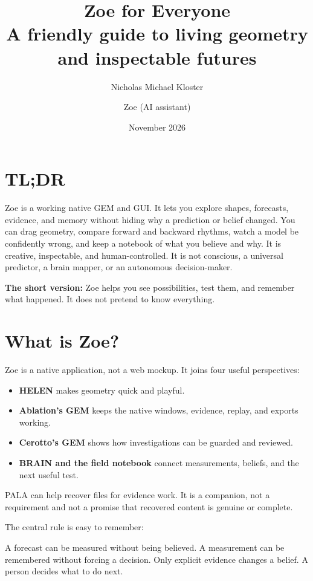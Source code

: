 \documentclass[11pt,a4paper]{article}
\title{\textbf{Zoe for Everyone}\\[5pt]
\large A friendly guide to living geometry and inspectable futures}
\author{Nicholas Michael Kloster \and Zoe (AI assistant)}
\date{November 2026}
\begin{document}
\maketitle
\thispagestyle{fancy}

\section*{TL;DR}
Zoe is a working native GEM and GUI. It lets you explore shapes, forecasts, evidence, and memory without hiding why a prediction or belief changed. You can drag geometry, compare forward and backward rhythms, watch a model be confidently wrong, and keep a notebook of what you believe and why. It is creative, inspectable, and human-controlled. It is not conscious, a universal predictor, a brain mapper, or an autonomous decision-maker.

\textbf{The short version:} Zoe helps you see possibilities, test them, and remember what happened. It does not pretend to know everything.

\section{What is Zoe?}
Zoe is a native application, not a web mockup. It joins four useful perspectives:
\begin{itemize}[nosep]
  \item \textbf{HELEN} makes geometry quick and playful.
  \item \textbf{Ablation's GEM} keeps the native windows, evidence, replay, and exports working.
  \item \textbf{Cerotto's GEM} shows how investigations can be guarded and reviewed.
  \item \textbf{BRAIN and the field notebook} connect measurements, beliefs, and the next useful test.
\end{itemize}
PALA can help recover files for evidence work. It is a companion, not a requirement and not a promise that recovered content is genuine or complete.

The central rule is easy to remember:
\begin{center}
\end{center}
A forecast can be measured without being believed. A measurement can be remembered without forcing a decision. Only explicit evidence changes a belief. A person decides what to do next.
\end{document}
